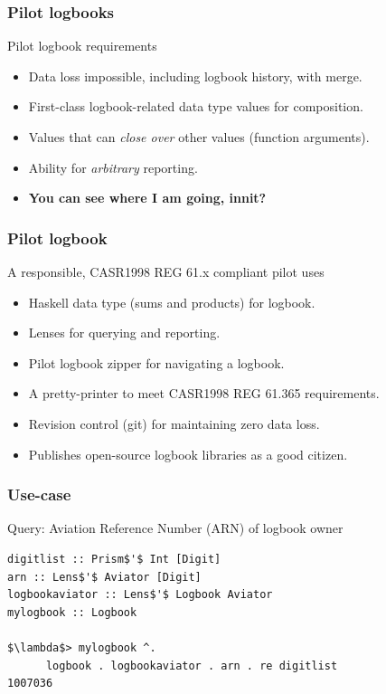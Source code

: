 \begin{frame}
\frametitle{Pilot logbooks}
\begin{block}{Pilot logbook requirements}
\begin{itemize}
\item<1-> Data loss impossible, including logbook history, with merge.
\item<2-> First-class logbook-related data type values for composition.
\item<3-> Values that can \emph{close over} other values (function arguments).
\item<4-> Ability for \emph{arbitrary} reporting.
\item<5-> \textbf{You can see where I am going, innit?}
\end{itemize}
\end{block}
\end{frame}

\begin{frame}
\frametitle{Pilot logbook}
\begin{block}{A responsible, CASR1998 REG 61.x compliant pilot uses}
\begin{itemize}
\item<1-> Haskell data type (sums and products) for logbook.
\item<1-> Lenses for querying and reporting.
\item<1-> Pilot logbook zipper for navigating a logbook.
\item<1-> A pretty-printer to meet CASR1998 REG 61.365 requirements.
\item<1-> Revision control (git) for maintaining zero data loss.
\item<1-> Publishes open-source logbook libraries as a good citizen.
\end{itemize}
\end{block}
\end{frame}

\begin{frame}[fragile]
\frametitle{Use-case}
\begin{block}{Query: Aviation Reference Number (ARN) of logbook owner}
\begin{lstlisting}[style=haskell,basicstyle=\scriptsize\ttfamily,mathescape]
digitlist :: Prism$'$ Int [Digit]
arn :: Lens$'$ Aviator [Digit]
logbookaviator :: Lens$'$ Logbook Aviator
mylogbook :: Logbook

$\lambda$> mylogbook ^.
      logbook . logbookaviator . arn . re digitlist
1007036
\end{lstlisting}
\end{block}
\end{frame}

